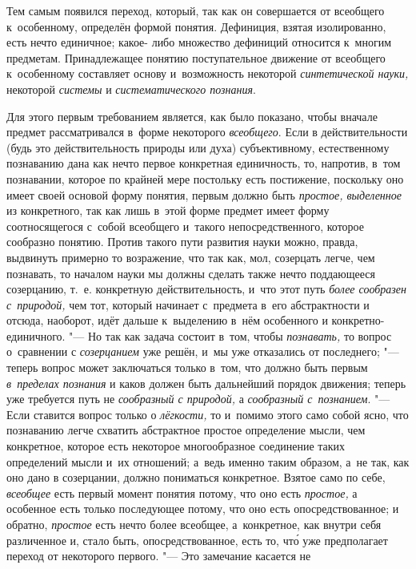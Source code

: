Тем самым появился переход, который, так как он совершается от
всеобщего к~особенному, определён формой понятия. Дефиниция, взятая
изолированно, есть нечто единичное; какое- либо множество дефиниций
относится к~многим предметам. Принадлежащее понятию поступательное движение
от всеобщего к~особенному составляет основу и~возможность некоторой
{\em синтетической науки,}
некоторой {\em системы}
и {\em систематического
познания}.

Для этого первым требованием является, как было показано,
чтобы вначале предмет рассматривался в~форме некоторого
{\em всеобщего}. Если в
действительности (будь это действительность природы или духа)
субъективному, естественному познаванию дана как нечто первое конкретная
единичность, то, напротив, в~том познавании, которое по крайней мере
постольку есть постижение, поскольку оно имеет своей основой форму понятия,
первым должно быть {\em простое,
выделенное} из конкретного, так как лишь в~этой форме
предмет имеет форму соотносящегося с~собой всеобщего и~такого
непосредственного, которое сообразно понятию. Против такого пути развития
науки можно, правда, выдвинуть примерно то возражение, что так как, мол,
созерцать легче, чем познавать, то началом науки мы должны
сделать также нечто поддающееся созерцанию, т.~е. конкретную
действительность, и~что этот путь
{\em более сообразен с~природой,}
чем тот, который начинает с~предмета в~его абстрактности и
отсюда, наоборот, идёт дальше к~выделению в~нём особенного и
конкретно-единичного. "--- Но так как задача состоит в~том,
чтобы {\em познавать,} то
вопрос о~сравнении с {\em созерцанием}
уже решён, и~мы уже отказались от последнего;
"--- теперь вопрос может заключаться только в~том, что должно
быть первым {\em в~пределах познания}
и каков должен быть дальнейший порядок движения; теперь уже
требуется путь не {\em сообразный с
природой,} а{\em
сообразный с~познанием}. "--- Если ставится
вопрос только о {\em лёгкости,}
то и~помимо этого само собой ясно, что познаванию легче
схватить абстрактное простое определение мысли, чем конкретное, которое
есть некоторое многообразное соединение таких определений мысли и~их
отношений; а~ведь именно таким образом, а~не так, как оно дано в
созерцании, должно пониматься конкретное. Взятое само по себе,
{\em всеобщее} есть
первый момент понятия потому, что оно есть
{\em простое,} а
особенное есть только последующее потому, что оно есть опосредствованное; и
обратно, {\em простое}
есть нечто более всеобщее, а~конкретное, как внутри себя
различенное и, стало быть, опосредствованное, есть то, чт\'{о} уже предполагает
переход от некоторого первого. "--- Это замечание касается не
